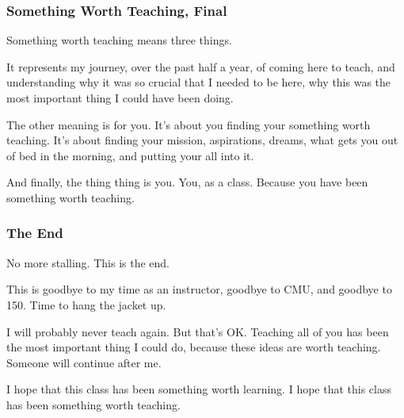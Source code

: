 \documentclass[aspectratio=169, handout]{beamer}
\begin{document}
\begin{frame}[fragile]
  \frametitle{Something Worth Teaching, Final}

  Something worth teaching means three things.

  \pause
  \vspace{\fill}

  It represents my journey, over the past half a year, of coming here to teach,
  and understanding why it was so crucial that I needed to be here, why this was
  the most important thing I could have been doing.

  \pause
  \vspace{\fill}

  The other meaning is for you. It's about you finding your something worth teaching.
  It's about finding your mission, aspirations, dreams, what gets you out of bed
  in the morning, and putting your all into it.

  \pause
  \vspace{\fill}

  And finally, the thing thing is you. You, as a class. Because you have been
  something worth teaching.
\end{frame}

\begin{frame}[fragile]
  \frametitle{The End}

  No more stalling. This is the end.

  \pause
  \vspace{\fill}

  This is goodbye to my time as an instructor, goodbye to CMU, and goodbye to 150.
  Time to hang the jacket up.

  \pause
  \vspace{\fill}

  I will probably never teach again. But that's OK. Teaching all of you has been
  the most important thing I could do, because these ideas are worth teaching.
  Someone will continue after me.

  \begin{comment}
    i was never good at saying goodbye, so let’s shout it instead!

    i love functional programming, on the first day I told you this doesn’t matter
    but I realize now that nothing could matter more. I realize now that it means
    I’m teaching you something worth loving!
  \end{comment}

  \pause
  \vspace{\fill}

  I hope that this class has been something worth learning. I hope that this
  class has been something worth teaching.
\end{frame}
\end{document}
